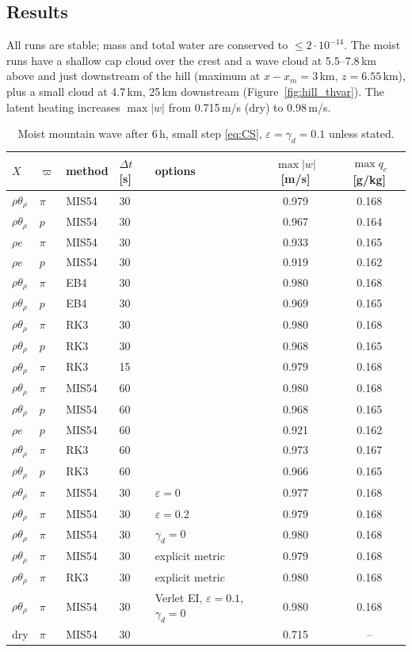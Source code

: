\documentclass[11pt,a4paper]{article}
\newcommand{\dt}{\Delta t}
\newcommand{\pv}{\varpi}      %
\begin{document}
\subsection{Results}
All runs are stable; mass and total water are conserved to $\le2\cdot10^{-14}$. The moist runs have a shallow
cap cloud over the crest and a wave cloud at 5.5--7.8\,km above and just downstream of the hill (maximum
at $x-x_m=3$\,km, $z=6.55$\,km), plus a small cloud at 4.7\,km, 25\,km downstream (Figure~\ref{fig:hill_thvar}). The
latent heating increases $\max|w|$ from 0.715\,m/s (dry) to 0.98\,m/s.
\begin{table}[htbp]\centering\small
\caption{Moist mountain wave after 6\,h, small step \eqref{eq:CS}, $\varepsilon=\gamma_d=0.1$ unless stated.}\label{tab:hill}
\begin{tabular}{lllllcc}\toprule
$X$ & $\pv$ & method & $\dt$ [s] & options & $\max|w|$ [m/s] & $\max q_c$ [g/kg]\\\midrule
$\rho\theta_\rho$ & $\pi$ & MIS54 & 30 & & 0.979 & 0.168\\
$\rho\theta_\rho$ & $p$ & MIS54 & 30 & & 0.967 & 0.164\\
$\rho e$ & $\pi$ & MIS54 & 30 & & 0.933 & 0.165\\
$\rho e$ & $p$ & MIS54 & 30 & & 0.919 & 0.162\\
$\rho\theta_\rho$ & $\pi$ & EB4 & 30 & & 0.980 & 0.168\\
$\rho\theta_\rho$ & $p$ & EB4 & 30 & & 0.969 & 0.165\\
$\rho\theta_\rho$ & $\pi$ & RK3 & 30 & & 0.980 & 0.168\\
$\rho\theta_\rho$ & $p$ & RK3 & 30 & & 0.968 & 0.165\\
$\rho\theta_\rho$ & $\pi$ & RK3 & 15 & & 0.979 & 0.168\\
$\rho\theta_\rho$ & $\pi$ & MIS54 & 60 & & 0.980 & 0.168\\
$\rho\theta_\rho$ & $p$ & MIS54 & 60 & & 0.968 & 0.165\\
$\rho e$ & $p$ & MIS54 & 60 & & 0.921 & 0.162\\
$\rho\theta_\rho$ & $\pi$ & RK3 & 60 & & 0.973 & 0.167\\
$\rho\theta_\rho$ & $p$ & RK3 & 60 & & 0.966 & 0.165\\\midrule
$\rho\theta_\rho$ & $\pi$ & MIS54 & 30 & $\varepsilon=0$ & 0.977 & 0.168\\
$\rho\theta_\rho$ & $\pi$ & MIS54 & 30 & $\varepsilon=0.2$ & 0.979 & 0.168\\
$\rho\theta_\rho$ & $\pi$ & MIS54 & 30 & $\gamma_d=0$ & 0.980 & 0.168\\
$\rho\theta_\rho$ & $\pi$ & MIS54 & 30 & explicit metric & 0.979 & 0.168\\
$\rho\theta_\rho$ & $\pi$ & RK3 & 30 & explicit metric & 0.980 & 0.168\\
$\rho\theta_\rho$ & $\pi$ & MIS54 & 30 & Verlet EI, $\varepsilon=0.1$, $\gamma_d=0$ & 0.980 & 0.168\\
dry & $\pi$ & MIS54 & 30 & & 0.715 & --\\\bottomrule
\end{tabular}
\end{table}
\end{document}
